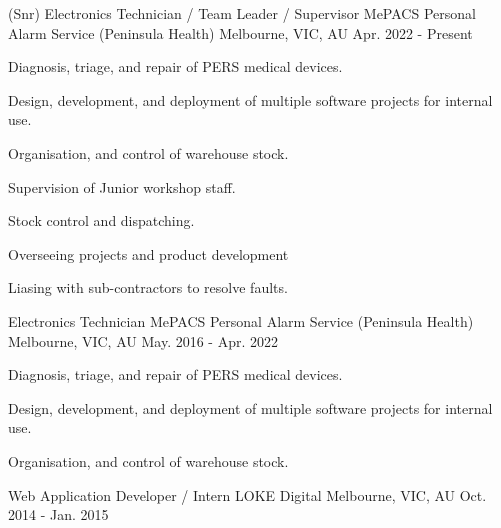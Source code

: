 

\begin{cventries}

  \cventry
    {(Snr) Electronics Technician / Team Leader / Supervisor} %
    {MePACS Personal Alarm Service (Peninsula Health)} %
    {Melbourne, VIC, AU} %
    {Apr. 2022 - Present} %
    {
      \begin{cvitems} %
        \item {Diagnosis, triage, and repair of PERS medical devices.}
        \item {Design, development, and deployment of multiple software projects for internal use.}
        \item {Organisation, and control of warehouse stock.}
        \item {Supervision of Junior workshop staff.}
        \item {Stock control and dispatching.}
        \item {Overseeing projects and product development}
        \item {Liasing with sub-contractors to resolve faults.}
      \end{cvitems}
    }
  \cventry
    {Electronics Technician} %
    {MePACS Personal Alarm Service (Peninsula Health)} %
    {Melbourne, VIC, AU} %
    {May. 2016 - Apr. 2022} %
    {
      \begin{cvitems} %
        \item {Diagnosis, triage, and repair of PERS medical devices.}
        \item {Design, development, and deployment of multiple software projects for internal use.}
        \item {Organisation, and control of warehouse stock.}
      \end{cvitems}
    }
  \cventry
    {Web Application Developer / Intern} %
    {LOKE Digital} %
    {Melbourne, VIC, AU} %
    {Oct. 2014 - Jan. 2015} %

\end{cventries}
